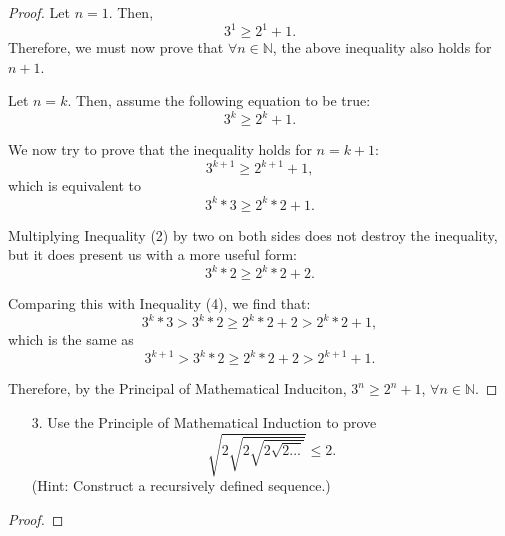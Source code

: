 \documentclass[10pt]{article}
\theoremstyle{definition}
\theoremstyle{plain}
\newcommand{\N}{\mathbb{N}}
\begin{document}
\begin{proof}
  Let $n=1$. Then,
  \begin{equation}
    3^1 \geq 2^1 + 1.
  \end{equation}
  Therefore, we must now prove that $\forall n\in\N$, the above inequality also holds for $n+1$.

  \par Let $n=k$. Then, assume the following equation to be true:
  \begin{equation}
    3^k \geq 2^k + 1.
  \end{equation}

  \par We now try to prove that the inequality holds for $n=k+1$:
  \begin{equation}
    3^{k+1} \geq 2^{k+1} + 1,
  \end{equation}
  which is equivalent to
  \begin{equation}
    3^{k}*3 \geq 2^{k}*2 + 1.
  \end{equation}

  \par Multiplying Inequality (2) by two on both sides does not destroy the inequality, but it does present us with a more useful form:
  \begin{equation}
    3^{k}*2 \geq 2^{k}*2 + 2.
  \end{equation}

  \par Comparing this with Inequality (4), we find that:
    $$3^{k}*3 > 3^{k}*2 \geq 2^{k}*2 + 2 > 2^{k}*2 + 1,$$
    which is the same as
  \begin{equation}
    3^{k+1} > 3^{k}*2 \geq 2^{k}*2 + 2 > 2^{k+1} + 1.
  \end{equation}

  \par Therefore, by the Principal of Mathematical Induciton, $3^n \geq 2^n + 1$, $\forall n\in\N$.
\end{proof}


\pagebreak



\begin{enumerate}
  \item[3.] Use the Principle of Mathematical Induction to prove
  $$\sqrt{2\sqrt{2\sqrt{2\sqrt{2...}}}} \leq 2.$$
  (Hint:  Construct a recursively defined sequence.)
\end{enumerate}

\begin{proof}
\end{proof}
\end{document}
